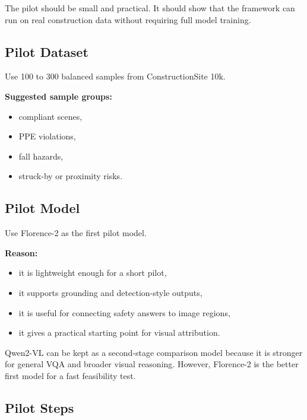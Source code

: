 \documentclass[11pt,letterpaper]{article}
\begin{document}
The pilot should be small and practical. It should show that the framework can run on real construction data without requiring full model training.

\subsection{Pilot Dataset}

Use 100 to 300 balanced samples from ConstructionSite 10k.

\textbf{Suggested sample groups:}
\begin{itemize}
  \item compliant scenes,
  \item PPE violations,
  \item fall hazards,
  \item struck-by or proximity risks.
\end{itemize}

\subsection{Pilot Model}

Use Florence-2 as the first pilot model.

\textbf{Reason:}
\begin{itemize}
  \item it is lightweight enough for a short pilot,
  \item it supports grounding and detection-style outputs,
  \item it is useful for connecting safety answers to image regions,
  \item it gives a practical starting point for visual attribution.
\end{itemize}

Qwen2-VL can be kept as a second-stage comparison model because it is stronger for general VQA and broader visual reasoning. However, Florence-2 is the better first model for a fast feasibility test.

\subsection{Pilot Steps}
\end{document}
